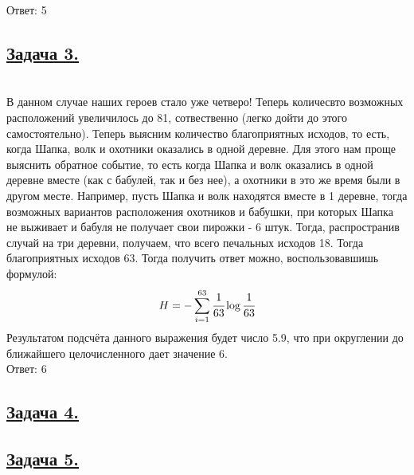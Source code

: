 Ответ: 5

\subsection*{\hyperref[sec:problem3]{Задача 3.}}
\label{sec:sol_problem3} \
\\ 

В данном случае наших героев стало уже четверо! Теперь количесвто возможных расположений увеличилось до 81, сотвественно (легко дойти до этого самостоятельно). Теперь выясним количество благоприятных исходов, то есть, когда Шапка, волк и охотники оказались в одной деревне. Для этого нам проще выяснить обратное событие, то есть когда Шапка и волк оказались в одной деревне вместе (как с бабулей, так и без нее), а охотники в это же время были в другом месте. Например, пусть Шапка и волк находятся вместе в 1 деревне, тогда возможных вариантов расположения охотников и бабушки, при которых Шапка не выживает и бабуля не получает свои пирожки - 6 штук. Тогда, распространив случай  на три деревни, получаем, что всего печальных исходов 18. Тогда благоприятных исходов 63. Тогда получить ответ можно, воспользовавшишь формулой: 
\[H=-\sum\limits_{i=1}^{63}  \cfrac{1}{63}\log \cfrac{1}{63} \]
Результатом подсчёта данного выражения будет число 5.9, что при округлении до ближайшего целочисленного дает значение 6. \\

Ответ: 6
\subsection*{\hyperref[sec:problem4]{Задача 4.}}
\label{sec:sol_problem4}

\subsection*{\hyperref[sec:problem5]{Задача 5.}}
\label{sec:sol_problem5}